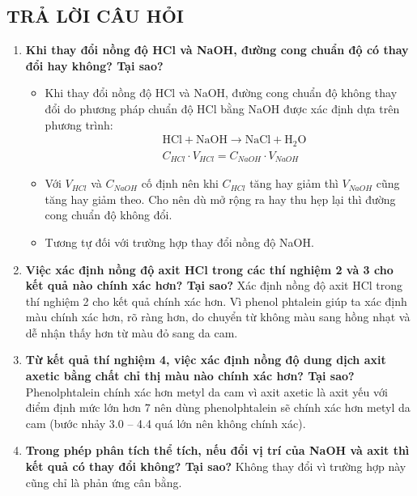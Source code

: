 \subsection{TRẢ LỜI CÂU HỎI}
\begin{enumerate}
    \item \textbf{Khi thay đổi nồng độ HCl và NaOH, đường cong chuẩn độ có thay đổi hay không? Tại sao?}
    \begin{itemize}
        \item Khi thay đổi nồng độ HCl và NaOH, đường cong chuẩn độ không thay đổi do phương pháp chuẩn độ HCl bằng NaOH được xác định dựa trên phương trình:
        \begin{align*}
            &\text{HCl} + \text{NaOH} \rightarrow \text{NaCl} + \text{H}_2\text{O} \\
            &C_{HCl} \cdot V_{HCl} = C_{NaOH} \cdot V_{NaOH}
        \end{align*}
        \item Với $V_{HCl}$ và $C_{NaOH}$ cố định nên khi $C_{HCl}$ tăng hay giảm thì $V_{NaOH}$ cũng tăng hay giảm theo. Cho nên dù mở rộng ra hay thu hẹp lại thì đường cong chuẩn độ không đổi.
        \item Tương tự đối với trường hợp thay đổi nồng độ NaOH.
    \end{itemize}
    \item \textbf{Việc xác định nồng độ axit HCl trong các thí nghiệm 2 và 3 cho kết quả nào chính xác hơn? Tại sao?}
    Xác định nồng độ axit HCl trong thí nghiệm 2 cho kết quả chính xác hơn. Vì phenol phtalein giúp ta xác định màu chính xác hơn, rõ ràng hơn, do chuyển từ không màu sang hồng nhạt và dễ nhận thấy hơn từ màu đỏ sang da cam.
    \item \textbf{Từ kết quả thí nghiệm 4, việc xác định nồng độ dung dịch axit axetic bằng chất chỉ thị màu nào chính xác hơn? Tại sao?}
    Phenolphtalein chính xác hơn metyl da cam vì axit axetic là axit yếu với điểm định mức lớn hơn 7 nên dùng phenolphtalein sẽ chính xác hơn metyl da cam (bước nhảy 3.0 – 4.4 quá lớn nên không chính xác).
    \item \textbf{Trong phép phân tích thể tích, nếu đổi vị trí của NaOH và axit thì kết quả có thay đổi không? Tại sao?}
    Không thay đổi vì trường hợp này cũng chỉ là phản ứng cân bằng.
\end{enumerate}
